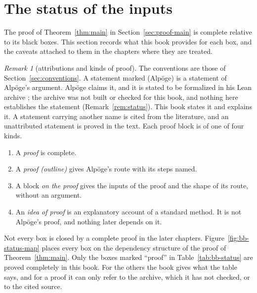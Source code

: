 \documentclass[11pt]{amsbook}
\theoremstyle{plain}
\theoremstyle{definition}
\theoremstyle{remark}
\newtheorem{remark}[theorem]{Remark}
\numberwithin{equation}{section}
\numberwithin{figure}{chapter}
\numberwithin{table}{chapter}
\begin{document}
\section{The status of the inputs}
\label{sec:bb-status}

The proof of Theorem~\ref{thm:main} in Section~\ref{sec:proof-main}
is complete relative to its black boxes. This section records what
this book provides for each box, and the caveats attached to them in
the chapters where they are treated.
\begin{figure}[tbp]
\centering

\end{figure}

\begin{remark}[attributions and kinds of proof]
\label{rem:bb-attribution}
The conventions are those of Section~\ref{sec:conventions}. A
statement marked (Alp\"oge) is a statement of Alp\"oge's argument.
Alp\"oge claims it, and it is stated to be formalized in his Lean
archive \cite{AlpogeArchive2026}; the archive was not built or
checked for this book, and nothing here establishes the statement
(Remark~\ref{rem:status}). This book states it and explains it. A
statement carrying another name is cited from the literature, and an
unattributed statement is proved in the text. Each proof block is of
one of four kinds.
\begin{enumerate}[label=(\arabic*)]
\item A \emph{proof} is complete.
\item A \emph{proof (outline)} gives Alp\"oge's route with its steps
named.
\item A block \emph{on the proof} gives the inputs of the proof and
the shape of its route, without an argument.
\item An \emph{idea of proof} is an explanatory account of a
standard method. It is not Alp\"oge's proof, and nothing later
depends on it.
\end{enumerate}
Not every box is closed by a complete proof in the later chapters.
Figure~\ref{fig:bb-status-map} places every box on the dependency structure of the proof of Theorem~\ref{thm:main}. Only the boxes marked ``proof'' in Table~\ref{tab:bb-status} are
proved completely in this book. For the others the book gives what
the table says, and for a proof it can only refer to the archive,
which it has not checked, or to the cited source.
\end{remark}
\end{document}
